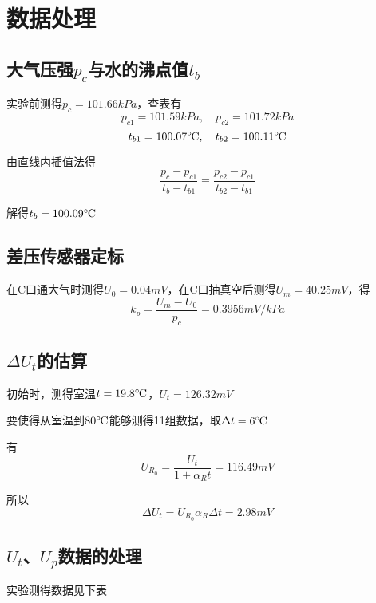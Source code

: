 \documentclass{thureport}
\def\celsius{{\ensuremath{^\circ\hspace{-0.09em}\mathrm{C}}}}
\begin{document}
\section{数据处理}
\subsection{大气压强$p_c$与水的沸点值$t_b$}
实验前测得$p_c=101.66kPa$，查表有
$$p_{c1}=101.59kPa,\quad p_{c2}=101.72kPa$$
$$t_{b1}=100.07\celsius,\quad t_{b2}=100.11\celsius$$

由直线内插值法得
$$\frac{p_c-p_{c1}}{t_b-t_{b1}}=\frac{p_{c2}-p_{c1}}{t_{b2}-t_{b1}}$$

解得$t_b=100.09\celsius$

\subsection{差压传感器定标}
在C口通大气时测得$U_0=0.04mV$，在C口抽真空后测得$U_m=40.25mV$，得
$$k_p=\frac{U_m-U_0}{p_c}=0.3956mV/kPa$$

\subsection{$\Delta U_t$的估算}
初始时，测得室温$t=19.8\celsius$，$U_t=126.32mV$

要使得从室温到$80\celsius$能够测得11组数据，取$\Delta t=6\celsius$

有$$U_{R_0}=\frac{U_t}{1+\alpha_Rt}=116.49mV$$

所以$$\Delta U_t=U_{R_0}\alpha_R\Delta t=2.98mV$$

\subsection{$U_t$、$U_p$数据的处理}

实验测得数据见下表
\end{document}
